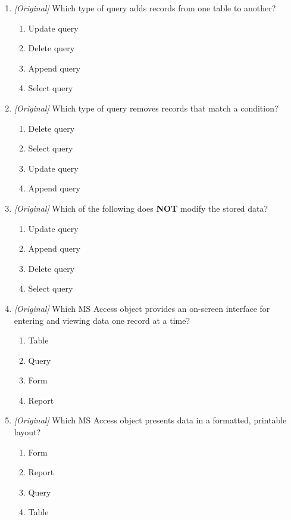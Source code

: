 \begin{enumerate}[label=\textbf{Q\arabic*.}, leftmargin=*]
\begin{enumerate}[label=\Alph*.]
    \item Crosstab query
  \end{enumerate}
\item \textit{[Original]} Which type of query adds records from one table to
  another?
  \begin{enumerate}[label=\Alph*.]
    \item Update query
    \item Delete query
    \item Append query
    \item Select query
  \end{enumerate}
\item \textit{[Original]} Which type of query removes records that match a
  condition?
  \begin{enumerate}[label=\Alph*.]
    \item Delete query
    \item Select query
    \item Update query
    \item Append query
  \end{enumerate}
\item \textit{[Original]} Which of the following does \textbf{NOT} modify the
  stored data?
  \begin{enumerate}[label=\Alph*.]
    \item Update query
    \item Append query
    \item Delete query
    \item Select query
  \end{enumerate}
\item \textit{[Original]} Which MS Access object provides an on-screen
  interface for entering and viewing data one record at a time?
  \begin{enumerate}[label=\Alph*.]
    \item Table
    \item Query
    \item Form
    \item Report
  \end{enumerate}
\item \textit{[Original]} Which MS Access object presents data in a
  formatted, printable layout?
  \begin{enumerate}[label=\Alph*.]
    \item Form
    \item Report
    \item Query
    \item Table

\end{enumerate}
\end{enumerate}
